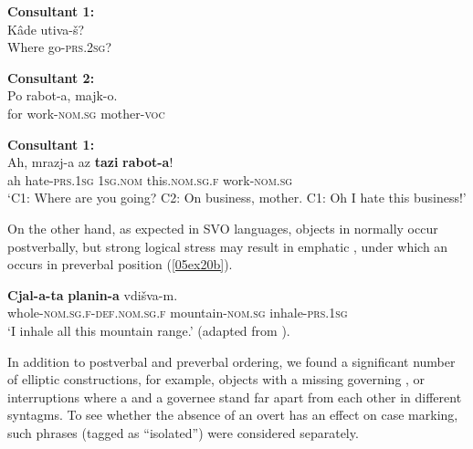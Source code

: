 \documentclass[output=paper,colorlinks,citecolor=brown]{langscibook}
\begin{document}
\begin{exe}
	\ex
	\begin{xlist}
	\ex \label{05ex20a}
	\textbf{Consultant 1:} \\
	\gll Kâde utiva-š? \\
	Where go-\textsc{prs.2sg}? \\
	
	\medskip
	
	\textbf{Consultant 2:} \\
	\gll Po rabot-a, majk-o. \\
	for work-\textsc{nom.sg} mother-\textsc{voc} \\
	
	\medskip
	
	\textbf{Consultant 1:} \\
	\gll Ah, mrazj-a az \textbf{tazi} \textbf{rabot-a}! \\
	ah hate-\textsc{prs.1sg} \textsc{1sg.nom} this.\textsc{nom.sg.f} work-\textsc{nom.sg} \\
	\trans ‘C1: Where are you going? C2: On business, mother. C1: Oh I hate this business!’
	
\medskip

\item[]  %
\noindent\hspace*{-4.5em}\parbox{\textwidth}{On the other hand, as expected in SVO languages, objects in  normally occur postverbally, but strong logical stress may result in emphatic , under which an  occurs in preverbal position (\ref{05ex20b}).}

\medskip

	\ex \label{05ex20b}
	\gll \textbf{Cjal-a-ta} \textbf{planin-a} vdišva-m. \\
	whole-\textsc{nom.sg.f-def.nom.sg.f} mountain-\textsc{nom.sg} inhale-\textsc{prs.1sg} \\
	\trans ‘I inhale all this mountain range.’ (adapted from \citealt[284]{georgieva1983}).
	\end{xlist}
\end{exe}

In addition to postverbal and preverbal ordering, we found a significant number of elliptic constructions, for example, objects with a missing governing , or interruptions where a  and a governee stand far apart from each other in different syntagms. To see whether the absence of an overt  has an effect on case marking, such phrases (tagged as ``isolated'') were considered separately.
\end{document}
